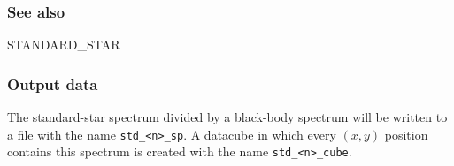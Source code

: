 \documentclass[twoside,11pt,nolof]{starlink}
\begin{document}
\subsubsection*{See also}

STANDARD\_STAR

\subsubsection*{Output data}

The standard-star spectrum divided by a black-body spectrum will be
written to a file with the name \texttt{std\_<n>\_sp}. A datacube in
which every $(x,y)$ position contains this spectrum is created with
the name \texttt{std\_<n>\_cube}.

\clearpage
\end{document}
